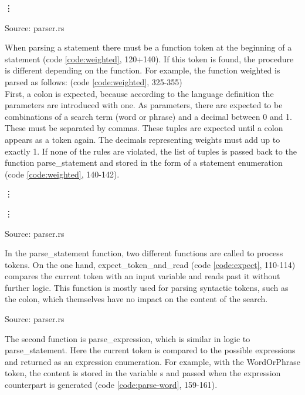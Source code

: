 \begin{codeenv}
    \label{code:read}
    
    \vdots
    
    \centerline{Source: parser.rs}
\end{codeenv}
When parsing a statement there must be a function token at the beginning of a statement (code \ref{code:weighted}, 120+140). If this token is found, the procedure is different depending on the function. For example, the function weighted is parsed as follows: (code \ref{code:weighted}, 325-355)\\
First, a colon is expected, because according to the language definition the parameters are introduced with one. As parameters, there are expected to be combinations of a search term (word or phrase) and a decimal between 0 and 1. These must be separated by commas. These tuples are expected until a colon appears as a token again. The decimals representing weights must add up to exactly 1. If none of the rules are violated, the list of tuples is passed back to the function parse\_statement and stored in the form of a statement enumeration (code \ref{code:weighted}, 140-142).
\begin{codeenv}
    \label{code:weighted}
    
    \vdots
    
    \vdots
    
    \centerline{Source: parser.rs}
\end{codeenv}
In the parse\_statement function, two different functions are called to process tokens. On the one hand, expect\_token\_and\_read (code \ref{code:expect}, 110-114) compares the current token with an input variable and reads past it without further logic. This function is mostly used for parsing syntactic tokens, such as the colon, which themselves have no impact on the content of the search.
\begin{codeenv}
    \label{code:expect}
    
    \centerline{Source: parser.rs}
\end{codeenv}
The second function is parse\_expression, which is similar in logic to parse\_statement. Here the current token is compared to the possible expressions and returned as an expression enumeration. For example, with the WordOrPhrase token, the content is stored in the variable s and passed when the expression counterpart is generated (code \ref{code:parse-word}, 159-161).
